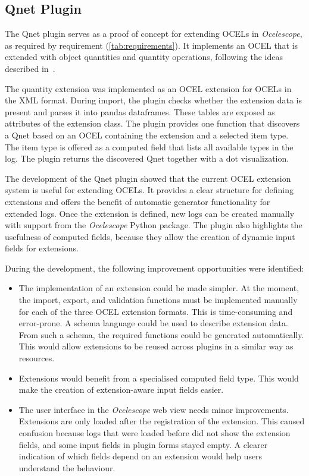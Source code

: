 \subsection*{Qnet Plugin}

The Qnet plugin serves as a proof of concept for extending OCELs in \textit{Ocelescope}, as required by requirement  (\autoref{tab:requirements}).
It implements an OCEL that is extended with object quantities and quantity operations, following the ideas described in~\cite{qrpm}.

The quantity extension was implemented as an OCEL extension for OCELs in the XML format. During import, the plugin checks whether the extension data is present and parses it into pandas dataframes.
These tables are exposed as attributes of the extension class.
The plugin provides one function that discovers a Qnet based on an OCEL containing the extension and a selected item type.
The item type is offered as a computed field that lists all available types in the log.
The plugin returns the discovered Qnet together with a dot visualization.

The development of the Qnet plugin showed that the current OCEL extension system is useful for extending OCELs. It provides a clear structure for defining extensions and offers the benefit of automatic generator functionality for extended logs. Once the extension is defined, new logs can be created manually with support from the \textit{Ocelescope} Python package. The plugin also highlights the usefulness of computed fields, because they allow the creation of dynamic input fields for extensions.

During the development, the following improvement opportunities were identified:

\begin{itemize}
	\item The implementation of an extension could be made simpler. At the moment, the import, export, and validation functions must be implemented manually for each of the three OCEL extension formats. This is time-consuming and error-prone. A schema language could be used to describe extension data. From such a schema, the required functions could be generated automatically. This would allow extensions to be reused across plugins in a similar way as resources.
	\item Extensions would benefit from a specialised computed field type. This would make the creation of extension-aware input fields easier.
	\item The user interface in the \textit{Ocelescope} web view needs minor improvements. Extensions are only loaded after the registration of the extension. This caused confusion because logs that were loaded before did not show the extension fields, and some input fields in plugin forms stayed empty. A clearer indication of which fields depend on an extension would help users understand the behaviour.
\end{itemize}

